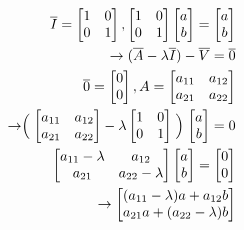 \documentclass[10pt, letterpaper]{article}
\begin{document}
\begin{align*}
\overline{I} = \begin{bmatrix}
	1 & 0\\
	0 & 1
\end{bmatrix}, \begin{bmatrix}
	1 & 0\\
	0 & 1
\end{bmatrix} \begin{bmatrix}
	a\\
	b
\end{bmatrix} = \begin{bmatrix}
	a\\
	b
\end{bmatrix}\\
\rightarrow (\overline{A} - \lambda \overline{I}) -\overline{V} = \overline{0}\\
\overline{0} = \begin{bmatrix}
	0\\
	0
\end{bmatrix}, A= \begin{bmatrix}
	a_{11} & a_{12}\\
	a_{21} & a_{22}
\end{bmatrix}\\
\rightarrow \Bigm( \begin{bmatrix}
	a_{11} & a_{12}\\
	a_{21} & a_{22}
\end{bmatrix} -\lambda \begin{bmatrix}
	1 & 0\\
	0 & 1
\end{bmatrix} \Bigm) \begin{bmatrix}
	a\\
	b
\end{bmatrix} = 0\\
\begin{bmatrix}
	a_{11} - \lambda & a_{12}\\
	a_{21} & a_{22} - \lambda
\end{bmatrix} \begin{bmatrix}
	a\\
	b
\end{bmatrix} = \begin{bmatrix}
	0\\
	0
\end{bmatrix}\\
\rightarrow \begin{bmatrix}
	(a_{11}-\lambda)a+a_{12}b\\
	a_{21}a+(a_{22}-\lambda)b

\end{bmatrix}
\end{align*}
\end{document}

